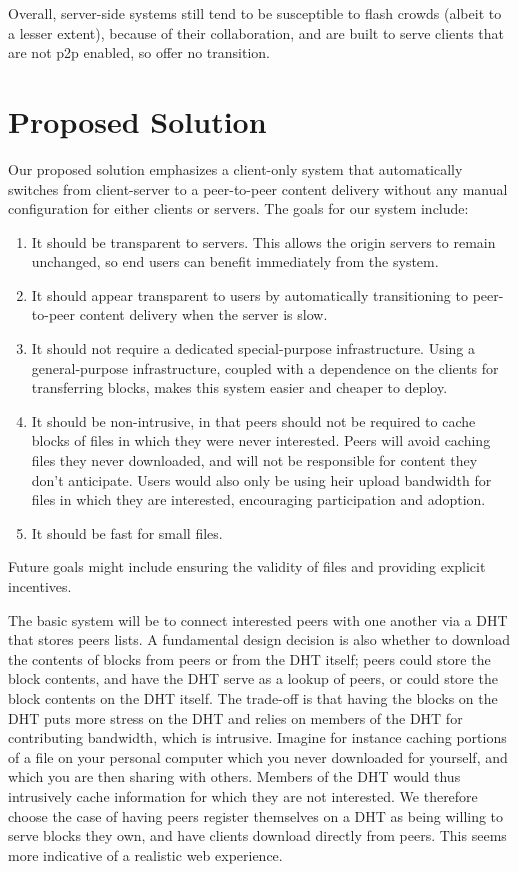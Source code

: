 Overall, server-side systems still tend to be susceptible to flash crowds (albeit to a lesser extent), because of their collaboration, and are built to serve clients that are not p2p enabled, so offer no transition.


\section {Proposed Solution}\label{section:solution}
Our proposed solution emphasizes a client-only system that automatically switches from client-server to a peer-to-peer content delivery without any manual configuration for either clients or servers.  The goals for our system include:
\begin{enumerate}
\item It should be transparent to servers.  This allows the origin servers to remain unchanged, so end users can benefit immediately from the system.
\item It should appear transparent to users by automatically transitioning to peer-to-peer content delivery when the server is slow.
\item It should not require a dedicated special-purpose infrastructure.  Using a general-purpose infrastructure, coupled with a dependence on the clients for transferring blocks, makes this system easier and cheaper to deploy.
\item It should be non-intrusive, in that peers should not be required to cache blocks of files in which they were never interested.  Peers will avoid caching files they never downloaded, and will not be responsible for content they don't anticipate.  Users would also only be using heir upload bandwidth for files in which they are interested, encouraging participation and adoption.
\item It should be fast for small files.
\end{enumerate} 

Future goals might include ensuring the validity of files and providing explicit incentives.

The basic system will be to connect interested peers with one another via a DHT that stores peers lists.  A fundamental design decision is also whether to download the contents of blocks from peers or from the DHT itself; peers could store the block contents, and have the DHT serve as a lookup of peers, or could store the block contents on the DHT itself.  The trade-off is that having the blocks on the DHT puts more stress on the DHT and relies on members of the DHT for contributing bandwidth, which is intrusive.  Imagine for instance caching portions of a file on your personal computer which you never downloaded for yourself, and which you are then sharing with others.  Members of the DHT would thus intrusively cache information for which they are not interested.  We therefore choose the case of having peers register themselves on a DHT as being willing to serve blocks they own, and have clients download directly from peers.  This seems more indicative of a realistic web experience.

